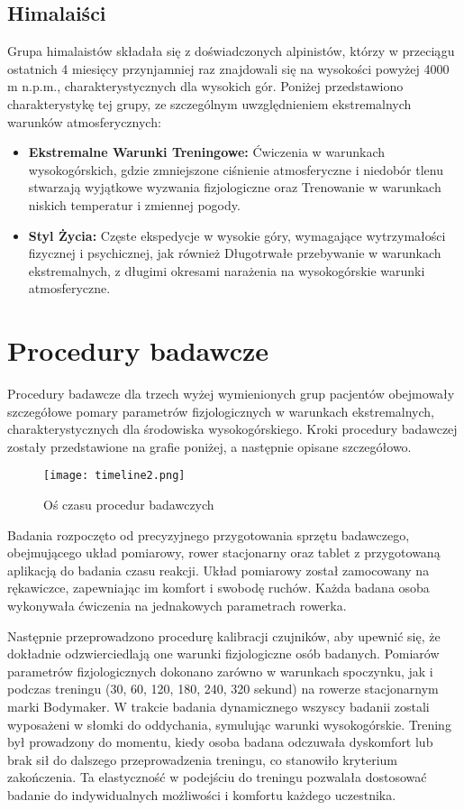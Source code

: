 \subsection{Himalaiści}
Grupa himalaistów składała się z doświadczonych alpinistów, którzy w przeciągu ostatnich 4 miesięcy przynjamniej raz znajdowali się na wysokości powyżej 4000 m n.p.m., charakterystycznych dla wysokich gór. Poniżej przedstawiono charakterystykę tej grupy, ze szczególnym uwzględnieniem ekstremalnych warunków atmosferycznych:
\begin{itemize}
    \item \textbf{Ekstremalne Warunki Treningowe: } Ćwiczenia w warunkach wysokogórskich, gdzie zmniejszone ciśnienie atmosferyczne i niedobór tlenu stwarzają wyjątkowe wyzwania fizjologiczne oraz Trenowanie w warunkach niskich temperatur i zmiennej pogody.
    \item \textbf{Styl Życia: } Częste ekspedycje w wysokie góry, wymagające wytrzymałości fizycznej i psychicznej, jak również Długotrwałe przebywanie w warunkach ekstremalnych, z długimi okresami narażenia na wysokogórskie warunki atmosferyczne.
\end{itemize}
\section{Procedury badawcze}
Procedury badawcze dla trzech wyżej wymienionych grup pacjentów obejmowały szczegółowe pomary parametrów fizjologicznych w warunkach ekstremalnych, charakterystycznych dla środowiska wysokogórskiego. Kroki procedury badawczej zostały przedstawione na grafie poniżej, a następnie opisane szczegółowo.
\begin{figure}[!htb]
    \centering
    \texttt{[image: timeline2.png]}
    \caption{Oś czasu procedur badawczych}
\end{figure}

Badania rozpoczęto od precyzyjnego przygotowania sprzętu badawczego, obejmującego układ pomiarowy, rower stacjonarny oraz tablet z przygotowaną aplikacją do badania czasu reakcji. Układ pomiarowy został zamocowany na rękawiczce, zapewniając im komfort i swobodę ruchów. Każda badana osoba wykonywała ćwiczenia na jednakowych parametrach rowerka.

Następnie przeprowadzono procedurę kalibracji czujników, aby upewnić się, że dokładnie odzwierciedlają one warunki fizjologiczne osób badanych. Pomiarów parametrów fizjologicznych dokonano zarówno w warunkach spoczynku, jak i podczas treningu (30, 60, 120, 180, 240, 320 sekund) na rowerze stacjonarnym marki Bodymaker. W trakcie badania dynamicznego wszyscy badanii zostali wyposażeni w słomki do oddychania, symulując warunki wysokogórskie. Trening był prowadzony do momentu, kiedy osoba badana odczuwała dyskomfort lub brak sił do dalszego przeprowadzenia treningu, co stanowiło kryterium zakończenia. Ta elastyczność w podejściu do treningu pozwalała dostosować badanie do indywidualnych możliwości i komfortu każdego uczestnika.

